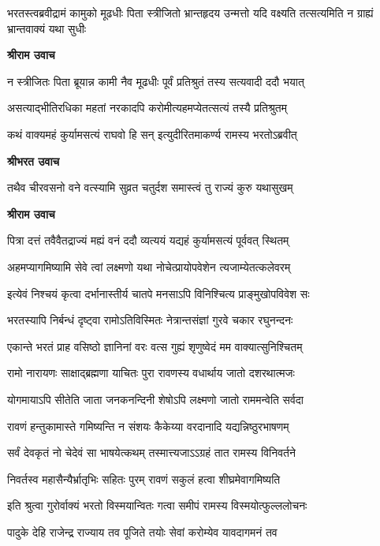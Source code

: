 \threelineshloka
{भरतस्त्वब्रवीद्रामं कामुको मूढधीः पिता}
{स्त्रीजितो भ्रान्तहृदय उन्मत्तो यदि वक्ष्यति}
{तत्सत्यमिति न ग्राह्यं भ्रान्तवाक्यं यथा सुधीः} %

\textbf{श्रीराम उवाच}

\twolineshloka
{न स्त्रीजितः पिता ब्रूयान्न कामी नैव मूढधीः}
{पूर्वं प्रतिश्रुतं तस्य सत्यवादी ददौ भयात्} %

\twolineshloka
{असत्याद्भीतिरधिका महतां नरकादपि}
{करोमीत्यहमप्येतत्सत्यं तस्यै प्रतिश्रुतम्} %

\twolineshloka
{कथं वाक्यमहं कुर्यामसत्यं राघवो हि सन्}
{इत्युदीरितमाकर्ण्य रामस्य भरतोऽब्रवीत्} %

\textbf{श्रीभरत उवाच}

\twolineshloka
{तथैव चीरवसनो वने वत्स्यामि सुव्रत}
{चतुर्दश समास्त्वं तु राज्यं कुरु यथासुखम्} %

\textbf{श्रीराम उवाच}

\twolineshloka
{पित्रा दत्तं तवैवैतद्राज्यं मह्यं वनं ददौ}
{व्यत्ययं यद्यहं कुर्यामसत्यं पूर्ववत् स्थितम्} %

\twolineshloka
{अहमप्यागमिष्यामि सेवे त्वां लक्ष्मणो यथा}
{नोचेत्प्रायोपवेशेन त्यजाम्येतत्कलेवरम्} %

\twolineshloka
{इत्येवं निश्चयं कृत्वा दर्भानास्तीर्य चातपे}
{मनसाऽपि विनिश्चित्य प्राङ्मुखोपविवेश सः} %

\twolineshloka
{भरतस्यापि निर्बन्धं दृष्ट्वा रामोऽतिविस्मितः}
{नेत्रान्तसंज्ञां गुरवे चकार रघुनन्दनः} %

\twolineshloka
{एकान्ते भरतं प्राह वसिष्ठो ज्ञानिनां वरः}
{वत्स गुह्यं शृणुष्वेदं मम वाक्यात्सुनिश्चितम्} %

\twolineshloka
{रामो नारायणः साक्षाद्ब्रह्मणा याचितः पुरा}
{रावणस्य वधार्थाय जातो दशरथात्मजः} %

\twolineshloka
{योगमायाऽपि सीतेति जाता जनकनन्दिनी}
{शेषोऽपि लक्ष्मणो जातो राममन्वेति सर्वदा} %

\twolineshloka
{रावणं हन्तुकामास्ते गमिष्यन्ति न संशयः}
{कैकेय्या वरदानादि यद्यन्निष्ठुरभाषणम्} %

\twolineshloka
{सर्वं देवकृतं नो चेदेवं सा भाषयेत्कथम्}
{तस्मात्त्यजाऽऽग्रहं तात रामस्य विनिवर्तने} %

\twolineshloka
{निवर्तस्व महासैन्यैर्भ्रातृभिः सहितः पुरम्}
{रावणं सकुलं हत्वा शीघ्रमेवागमिष्यति} %

\twolineshloka
{इति श्रुत्वा गुरोर्वाक्यं भरतो विस्मयान्वितः}
{गत्वा समीपं रामस्य विस्मयोत्फुल्ललोचनः} %

\twolineshloka
{पादुके देहि राजेन्द्र राज्याय तव पूजिते}
{तयोः सेवां करोम्येव यावदागमनं तव} %

